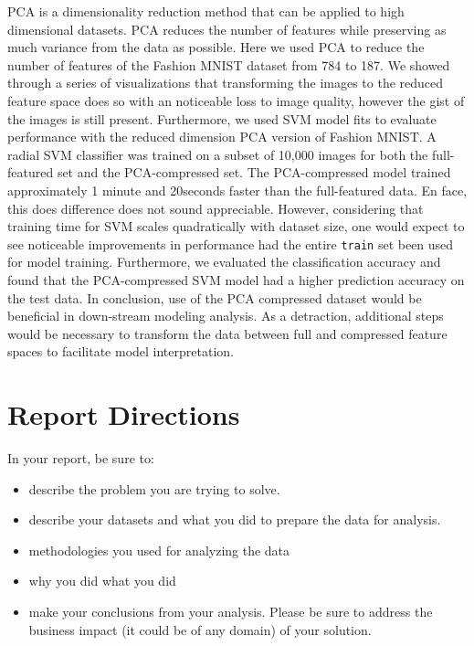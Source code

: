 \documentclass{article}
\begin{document}
PCA is a dimensionality reduction method that can be applied to high
dimensional datasets. PCA reduces the number of features while
preserving as much variance from the data as possible. Here we used PCA
to reduce the number of features of the Fashion MNIST dataset from 784
to 187. We showed through a series of visualizations that transforming
the images to the reduced feature space does so with an noticeable loss
to image quality, however the gist of the images is still present.
Furthermore, we used SVM model fits to evaluate performance with the
reduced dimension PCA version of Fashion MNIST. A radial SVM classifier
was trained on a subset of 10,000 images for both the full-featured set
and the PCA-compressed set. The PCA-compressed model trained
approximately 1 minute and 20seconds faster than the full-featured data.
En face, this does difference does not sound appreciable. However,
considering that training time for SVM scales quadratically with dataset
size, one would expect to see noticeable improvements in performance had
the entire \texttt{train} set been used for model training. Furthermore,
we evaluated the classification accuracy and found that the
PCA-compressed SVM model had a higher prediction accuracy on the test
data. In conclusion, use of the PCA compressed dataset would be
beneficial in down-stream modeling analysis. As a detraction, additional
steps would be necessary to transform the data between full and
compressed feature spaces to facilitate model interpretation.

\hypertarget{report-directions}{%
\section{Report Directions}\label{report-directions}}

In your report, be sure to:

\begin{itemize}
\item
  describe the problem you are trying to solve.
\item
  describe your datasets and what you did to prepare the data for
  analysis.
\item
  methodologies you used for analyzing the data
\item
  why you did what you did
\item
  make your conclusions from your analysis. Please be sure to address
  the business impact (it could be of any domain) of your solution.
\end{itemize}
\end{document}
